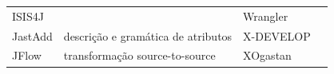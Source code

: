 \begin{table}[H]
{\begin{tabular}{| l | l | l | l |}
  ISIS4J              &                                  & Wrangler            &                                      \\
  JastAdd             & descrição e gramática de atributos & X-DEVELOP           &                                      \\
  JFlow               & transformação source-to-source   & XOgastan            &                                      \\
  \hline
\end{tabular}
\label{resumo-de-ferramentas}
}
\end{table}

% 
% 
% 
% 
% 
% 
% 
% 
% 
% 
